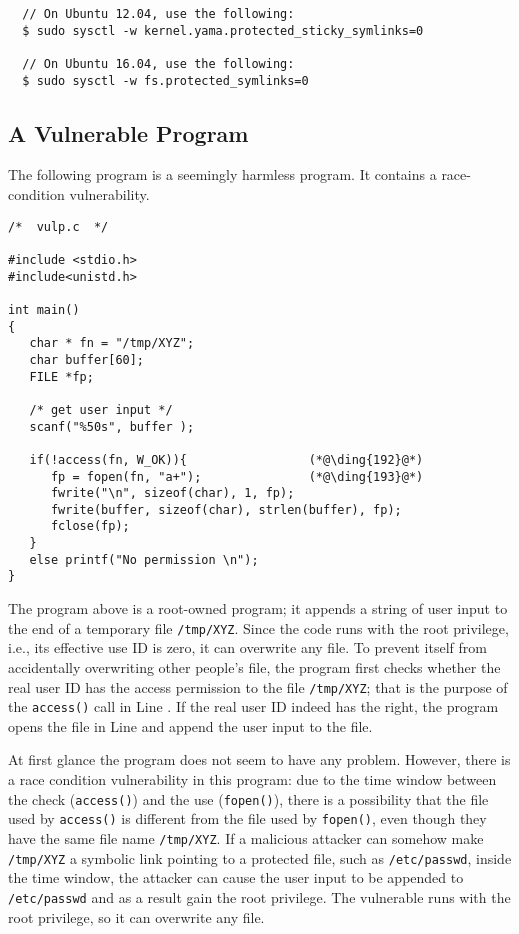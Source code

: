 \begin{lstlisting}
  // On Ubuntu 12.04, use the following:
  $ sudo sysctl -w kernel.yama.protected_sticky_symlinks=0

  // On Ubuntu 16.04, use the following:
  $ sudo sysctl -w fs.protected_symlinks=0
\end{lstlisting}



\subsection{A Vulnerable Program}


The following program is a seemingly harmless program. It contains a race-condition
vulnerability. 

\begin{lstlisting}
/*  vulp.c  */

#include <stdio.h>
#include<unistd.h>

int main()
{
   char * fn = "/tmp/XYZ";
   char buffer[60];
   FILE *fp;

   /* get user input */
   scanf("%50s", buffer );

   if(!access(fn, W_OK)){                 (*@\ding{192}@*)
      fp = fopen(fn, "a+");               (*@\ding{193}@*)
      fwrite("\n", sizeof(char), 1, fp);
      fwrite(buffer, sizeof(char), strlen(buffer), fp);
      fclose(fp);
   }
   else printf("No permission \n");
}
\end{lstlisting}

The program above is a root-owned \setuid program;
it appends a string of user input to
the end of a temporary file {\tt /tmp/XYZ}. Since the code runs
with the root privilege, i.e., its effective use ID is zero, it 
can overwrite any file. To prevent itself from accidentally
overwriting other people's file, the program first 
checks whether the real user ID has the access permission to the file
{\tt /tmp/XYZ}; that is the purpose of the {\tt access()} call in Line
.  If the real user ID indeed has 
the right, the program opens the file in Line  and append the user
input to the file. 

At first glance the program does not seem to have any problem.
However, there is a race condition vulnerability in this program: due to the 
time window between the check ({\tt access()}) and 
the use ({\tt fopen()}), there is a possibility that the file used by
{\tt access()} is different from the file used by {\tt fopen()}, even
though they have the same file name {\tt /tmp/XYZ}.  If a malicious 
attacker can somehow make {\tt /tmp/XYZ} a symbolic link pointing to
a protected file, such as \texttt{/etc/passwd}, inside the time window, 
the attacker can cause the user input
to be appended to \texttt{/etc/passwd} and as a result gain the root
privilege. The vulnerable runs with the root privilege, so
it can overwrite any file.


